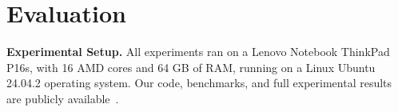 \section{Evaluation}
\label{sec:evaluation}



\noindent
\textbf{Experimental Setup.}
All experiments ran on a Lenovo Notebook ThinkPad P16s, with 16 AMD cores and 64 GB of RAM, running on a Linux Ubuntu 24.04.2 operating system.
%
%
Our code, benchmarks, and full experimental results are publicly available~\cite{ArtifactRepository}.
%
 



